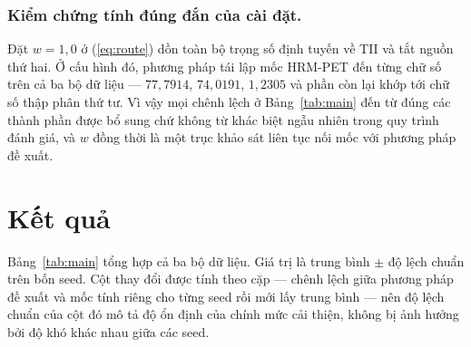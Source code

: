 \documentclass[runningheads]{llncs}
\begin{document}
\subsubsection{Kiểm chứng tính đúng đắn của cài đặt.}
Đặt $w = 1{,}0$ ở (\ref{eq:route}) dồn toàn bộ trọng số định tuyến về TII và tắt
nguồn thứ hai. Ở cấu hình đó, phương pháp tái lập mốc HRM-PET đến từng chữ số
trên cả ba bộ dữ liệu --- $77{,}7914$, $74{,}0191$, $1{,}2305$ và phần còn lại
khớp tới chữ số thập phân thứ tư. Vì vậy mọi chênh lệch ở Bảng~\ref{tab:main}
đến từ đúng các thành phần được bổ sung chứ không từ khác biệt ngẫu nhiên trong
quy trình đánh giá, và $w$ đồng thời là một trục khảo sát liên tục nối mốc với
phương pháp đề xuất.

\section{Kết quả}
\label{sec:results}

Bảng~\ref{tab:main} tổng hợp cả ba bộ dữ liệu. Giá trị là trung bình $\pm$ độ
lệch chuẩn trên bốn seed. Cột thay đổi được tính theo cặp --- chênh lệch giữa
phương pháp đề xuất và mốc tính riêng cho từng seed rồi mới lấy trung bình ---
nên độ lệch chuẩn của cột đó mô tả độ ổn định của chính mức cải thiện, không bị
ảnh hưởng bởi độ khó khác nhau giữa các seed.
\end{document}

